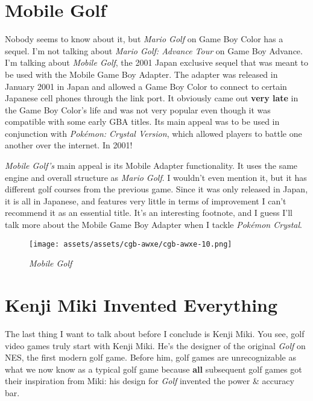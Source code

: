 \documentclass{book}
\begin{document}
\FloatBarrier\needspace{10mm}\section*{Mobile Golf}\nopagebreak[4]

Nobody seems to know about it, but \emph{Mario Golf} on Game Boy Color has a sequel. I’m not talking about \emph{Mario Golf: Advance Tour} on Game Boy Advance. I’m talking about \emph{Mobile Golf}, the 2001 Japan exclusive sequel that was meant to be used with the Mobile Game Boy Adapter. The adapter was released in January 2001 in Japan and allowed a Game Boy Color to connect to certain Japanese cell phones through the link port. It obviously came out \textbf{very late} in the Game Boy Color’s life and was not very popular even though it was compatible with some early GBA titles. Its main appeal was to be used in conjunction with \emph{Pokémon: Crystal Version}, which allowed players to battle one another over the internet. In 2001!

\emph{Mobile Golf’s} main appeal is its Mobile Adapter functionality. It uses the same engine and overall structure as \emph{Mario Golf}. I wouldn’t even mention it, but it has different golf courses from the previous game. Since it was only released in Japan, it is all in Japanese, and features very little in terms of improvement I can’t recommend it as an essential title. It’s an interesting footnote, and I guess I’ll talk more about the Mobile Game Boy Adapter when I tackle \emph{Pokémon Crystal}.

\begin{figure}[hbt]
\vskip 10pt
\centering \texttt{[image: assets/assets/cgb-awxe/cgb-awxe-10.png]}\par\pagetwodescription \emph{Mobile Golf}
\vskip 6pt
\end{figure}

\FloatBarrier\needspace{10mm}\section*{Kenji Miki Invented Everything}\nopagebreak[4]

The last thing I want to talk about before I conclude is Kenji Miki. You see, golf video games truly start with Kenji Miki. He’s the designer of the original \emph{Golf} on NES, the first modern golf game. Before him, golf games are unrecognizable as what we now know as a typical golf game because \textbf{all} subsequent golf games got their inspiration from Miki: his design for \emph{Golf} invented the power \& accuracy bar.
\end{document}
